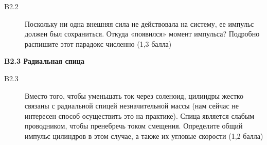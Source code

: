 \documentclass[a4paper, 14pt]{article}
\begin{document}
    \begin{description}
        \item [B2.2] Поскольку ни одна внешняя сила не действовала на систему, ее импульс должен был сохраниться.
        Откуда «появился» момент импульса?
        Подробно распишите этот парадокс численно (1,3 балла)
    \end{description}
    
    \textbf{B2.3 Радиальная спица}
    
    \begin{description}
        \item [B2.3] Вместо того, чтобы уменьшать ток через соленоид, цилиндры жестко связаны с радиальной спицей
        незначительной массы (нам сейчас не интересен способ осуществить это на практике).
        Спица является слабым проводником, чтобы пренебречь током смещения.
        Определите общий импульс цилиндров в этом случае, а также их угловые скорости (1,2 балла)
    \end{description}
    \author{
        \begin{flushright}
            предложено
            
            \textbf{Доц. Проф. Себастьяном ПОПЕСКУ, д-ром наук}
            
            Физический факультет Ясского университета имени Александру Иона Кузы, РУМЫНИЯ
        
        \end{flushright}
    }
\end{document}
